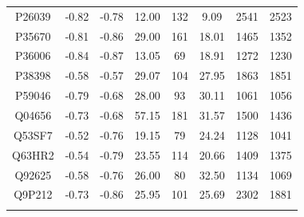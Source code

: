\begin{table}
\begin{tabular}{@{}cccccccc@{}}
P26039 & -0.82 & -0.78 & 12.00 & 132 & 9.09  & 2541 & 2523 \\
P35670 & -0.81 & -0.86 & 29.00 & 161 & 18.01 & 1465 & 1352 \\
P36006 & -0.84 & -0.87 & 13.05 & 69  & 18.91 & 1272 & 1230 \\
P38398 & -0.58 & -0.57 & 29.07 & 104 & 27.95 & 1863 & 1851 \\
P59046 & -0.79 & -0.68 & 28.00 & 93  & 30.11 & 1061 & 1056 \\
Q04656 & -0.73 & -0.68 & 57.15 & 181 & 31.57 & 1500 & 1436 \\
Q53SF7 & -0.52 & -0.76 & 19.15 & 79  & 24.24 & 1128 & 1041 \\
Q63HR2 & -0.54 & -0.79 & 23.55 & 114 & 20.66 & 1409 & 1375 \\
Q92625 & -0.58 & -0.76 & 26.00 & 80  & 32.50 & 1134 & 1069 \\
Q9P212 & -0.73 & -0.86 & 25.95 & 101 & 25.69 & 2302 & 1881 \\ \arrayrulecolor{black} \bottomrule
\end{tabular}
\end{table}

